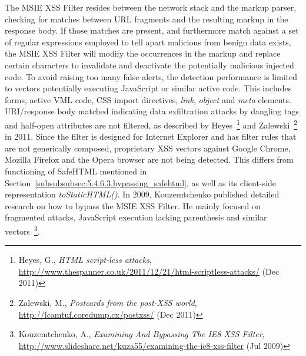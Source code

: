     The MSIE XSS Filter resides between the network stack and the markup parser, checking for matches between URL fragments and the resulting markup in the response body. If those matches are present, and furthermore match against a set of regular expressions employed to tell apart malicious from benign data exists, the MSIE XSS Filter will modify the occurrences in the markup and replace certain characters to invalidate and deactivate the potentially malicious injected code. To avoid raising too many false alerts, the detection performance is limited to vectors potentially executing JavaScript or similar active code. This includes forms, active VML code, CSS import directives, \textit{link}, \textit{object} and \textit{meta} elements. URI/response body matched indicating data exfiltration attacks by dangling tags and half-open attributes are not filtered, as described by Heyes~\footnote{Heyes, G., \textit{HTML script-less attacks}, \url{http://www.thespanner.co.uk/2011/12/21/html-scriptless-attacks/} (Dec 
2011)} and Zalewski~\footnote{Zalewski, M., \textit{Postcards from the post-XSS world}, \url{http://lcamtuf.coredump.cx/postxss/} (Dec 2011)} in 2011. Since the filter is designed for Internet Explorer and has filter rules that are not generically composed, proprietary XSS vectors against Google Chrome, Mozilla Firefox and the Opera browser are not being detected. This differs from functioning of SafeHTML mentioned in Section~\ref{subsubsubsec:5.4.6.3.bypassing_safehtml}, as well as its client-side representation \textit{toStaticHTML()}. In 2009, Kouzemtchenko published detailed research on how to bypass the MSIE XSS Filter. He mainly focused on fragmented attacks, JavaScript execution lacking parenthesis and similar vectors~\footnote{Kouzemtchenko, A., \textit{Examining And Bypassing The IE8 XSS Filter}, \url{http://www.slideshare.net/kuza55/examining-the-ie8-xss-filter} (Jul 2009)}.\\

